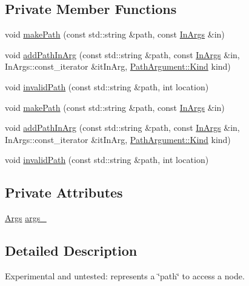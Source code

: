 \subsection*{Private Member Functions}
\begin{DoxyCompactItemize}
\item 
void \hyperlink{classJson_1_1Path_a874e5339f8059ebeef049721f8897277}{make\-Path} (const std\-::string \&path, const \hyperlink{classJson_1_1Path_a763349989466ac275fad176708378f95}{In\-Args} \&in)
\item 
void \hyperlink{classJson_1_1Path_af4d2ab3a6f09b69bab3d3e9fcdf13328}{add\-Path\-In\-Arg} (const std\-::string \&path, const \hyperlink{classJson_1_1Path_a763349989466ac275fad176708378f95}{In\-Args} \&in, In\-Args\-::const\-\_\-iterator \&it\-In\-Arg, \hyperlink{classJson_1_1PathArgument_a2420bbad778573c147e578701b84d9b9}{Path\-Argument\-::\-Kind} kind)
\item 
void \hyperlink{classJson_1_1Path_a3729e6d3682338b2cfad2c10d4746f53}{invalid\-Path} (const std\-::string \&path, int location)
\item 
void \hyperlink{classJson_1_1Path_a874e5339f8059ebeef049721f8897277}{make\-Path} (const std\-::string \&path, const \hyperlink{classJson_1_1Path_a763349989466ac275fad176708378f95}{In\-Args} \&in)
\item 
void \hyperlink{classJson_1_1Path_af4d2ab3a6f09b69bab3d3e9fcdf13328}{add\-Path\-In\-Arg} (const std\-::string \&path, const \hyperlink{classJson_1_1Path_a763349989466ac275fad176708378f95}{In\-Args} \&in, In\-Args\-::const\-\_\-iterator \&it\-In\-Arg, \hyperlink{classJson_1_1PathArgument_a2420bbad778573c147e578701b84d9b9}{Path\-Argument\-::\-Kind} kind)
\item 
void \hyperlink{classJson_1_1Path_a3729e6d3682338b2cfad2c10d4746f53}{invalid\-Path} (const std\-::string \&path, int location)
\end{DoxyCompactItemize}
\subsection*{Private Attributes}
\begin{DoxyCompactItemize}
\item 
\hyperlink{classJson_1_1Path_a27d96232d034d7a78286468676f9cb3e}{Args} \hyperlink{classJson_1_1Path_af33d0de7ee9f99d3e361bdf504dc2bc7}{args\-\_\-}
\end{DoxyCompactItemize}


\subsection{Detailed Description}
Experimental and untested\-: represents a \char`\"{}path\char`\"{} to access a node. 

